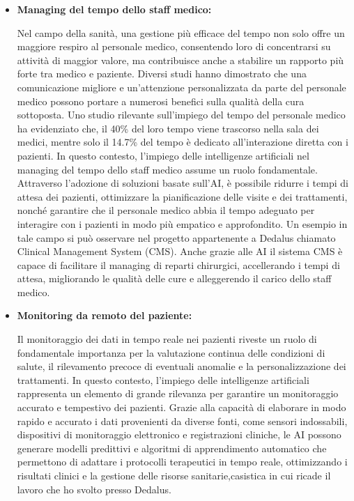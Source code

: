 \begin{itemize}
    \item \textbf{Managing del tempo dello staff medico:}

    Nel campo della sanità, una gestione più efficace del tempo non solo offre un maggiore respiro al personale medico, consentendo loro di concentrarsi su attività di maggior valore, ma contribuisce anche a stabilire un rapporto più forte tra medico e paziente. Diversi studi\cite{RelazionePazienteDoc1}\cite{RelazionePazienteDoc2} hanno dimostrato che una comunicazione migliore e un'attenzione personalizzata da parte del personale medico possono portare a numerosi benefici sulla qualità della cura sottoposta.
    Uno studio rilevante\cite{TempoMedici} sull'impiego del tempo del personale medico ha evidenziato che, il 40\% del loro tempo viene trascorso nella sala dei medici, mentre solo il 14.7\% del tempo è dedicato all'interazione diretta con i pazienti. In questo contesto, l'impiego delle intelligenze artificiali nel managing del tempo dello staff medico assume un ruolo fondamentale. Attraverso l'adozione di soluzioni basate sull'AI, è possibile ridurre i tempi di attesa dei pazienti, ottimizzare la pianificazione delle visite e dei trattamenti, nonché garantire che il personale medico abbia il tempo adeguato per interagire con i pazienti in modo più empatico e approfondito.
    Un esempio in tale campo si può osservare nel progetto appartenente a Dedalus chiamato Clinical Management System (CMS).
    Anche grazie alle AI il sistema CMS è capace di facilitare il managing di reparti chirurgici, accellerando i tempi di attesa, migliorando le qualità delle cure e alleggerendo il carico dello staff medico.\cite{CMSDedalus}
    \newline
    \newline
    \item \textbf{Monitoring da remoto del paziente:}

     Il monitoraggio dei dati in tempo reale nei pazienti riveste un ruolo di fondamentale importanza per la valutazione continua delle condizioni di salute, il rilevamento precoce di eventuali anomalie e la personalizzazione dei trattamenti. In questo contesto, l'impiego delle intelligenze artificiali rappresenta un elemento di grande rilevanza per garantire un monitoraggio accurato e tempestivo dei pazienti\cite{MonitorAI}.
     Grazie alla capacità di elaborare in modo rapido e accurato i dati provenienti da diverse fonti, come sensori indossabili, dispositivi di monitoraggio elettronico e registrazioni cliniche, le AI possono generare modelli predittivi e algoritmi di apprendimento automatico che permettono di adattare i protocolli terapeutici in tempo reale, ottimizzando i risultati clinici e la gestione delle risorse sanitarie,casistica in cui ricade il lavoro che ho svolto presso Dedalus.
     

\end{itemize}
